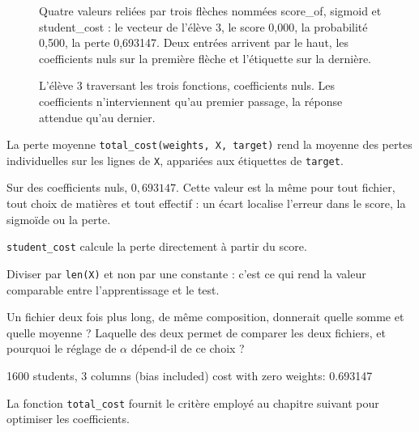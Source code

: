 \begin{figure}[htbp]
\centering
\begin{graphique}{Quatre valeurs reliées par trois flèches nommées score_of, sigmoid et student_cost : le vecteur de l'élève 3, le score 0,000, la probabilité 0,500, la perte 0,693147. Deux entrées arrivent par le haut, les coefficients nuls sur la première flèche et l'étiquette sur la dernière.}
\end{graphique}
\caption{L'élève $3$ traversant les trois fonctions, coefficients nuls. Les
coefficients n'interviennent qu'au premier passage, la réponse attendue qu'au
dernier.}
\label{fig:circuit}
\end{figure}
\FloatBarrier

\begin{tache}{La perte moyenne}
 \texttt{total\_cost(weights, X, target)} rend la moyenne des
pertes individuelles sur les lignes de \texttt{X}, appariées aux étiquettes de
\texttt{target}.

 Sur des coefficients nuls, $0{,}693147$.
Cette valeur est la même pour tout fichier, tout choix de matières et tout
effectif : un écart localise l'erreur dans le score, la sigmoïde ou la perte.

 \texttt{student\_cost} calcule la perte directement à partir du
score.

 Diviser par \texttt{len(X)} et non par une constante : c'est ce
qui rend la valeur comparable entre l'apprentissage et le test.

 Un fichier deux fois plus long, de même composition, donnerait
quelle somme et quelle moyenne ? Laquelle des deux permet de comparer les deux
fichiers, et pourquoi le réglage de $\alpha$ dépend-il de ce choix ?
\end{tache}

\begin{console}
1600 students, 3 columns (bias included)
cost with zero weights: 0.693147
\end{console}

La fonction \texttt{total\_cost} fournit le critère employé au chapitre suivant
pour optimiser les coefficients.
